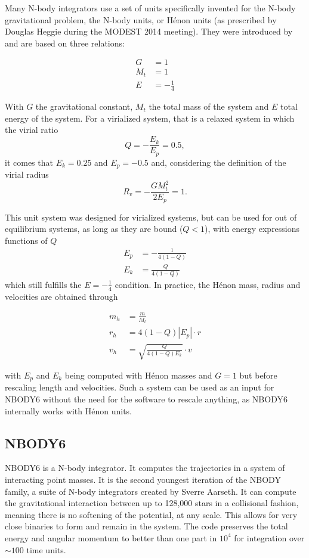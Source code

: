 Many N-body integrators use a set of units specifically invented for the N-body gravitational problem, the N-body units, or H\'enon units (as prescribed by Douglas Heggie during the MODEST 2014 meeting). They were introduced by \cite{Henon1971} and are based on three relations:

\begin{align}
G &= 1\\
M_t &= 1\\
E &= -\frac{1}{4}
\end{align}

With $G$ the gravitational constant, $M_t$ the total mass of the system and $E$ total energy of the system. For a virialized system, that is a relaxed system in which the virial ratio 
\begin{equation}
Q = - \frac{E_k}{E_p} = 0.5,
\end{equation}
it comes that $E_k=0.25$ and $E_p = -0.5$ and, considering the definition of the virial radius 
\begin{equation}
R_v = - \frac{G M_t^2}{2 E_p} = 1.
\end{equation} 

This unit system was designed for virialized systems, but can be used for out of equilibrium systems, as long as they are bound ($Q <1$), with energy expressions functions of $Q$
\begin{align}
E_p  &= - \frac{1}{4(1-Q)}\\
E_k &= \frac{Q}{4(1-Q)}
\end{align}
which still fulfills the $E = -\frac{1}{4}$ condition. In practice, the H\'enon mass, radius and velocities are obtained through

\begin{align}
m_h &= \frac{m}{M_t}\\
r_h &= 4 (1-Q) |E_p| \cdot r\\
v_h &= \sqrt{ \frac{Q}{4(1-Q) E_k} } \cdot v
\end{align}

with $E_p$ and $E_k$ being computed with H\'enon masses and $G=1$ but before rescaling length and velocities. Such a system can be used as an input for NBODY6 without the need for the software to rescale anything, as NBODY6 internally works with H\'enon units.


\subsection{NBODY6}


NBODY6 is a N-body integrator. It computes the trajectories in a system of interacting point masses. It is the second youngest iteration of the NBODY family, a suite of N-body integrators created by Sverre Aarseth. It can compute the gravitational interaction between up to 128,000 stars in a collisional fashion, meaning there is no softening of the potential, at any scale. This allows for very close binaries to form and remain in the system. The code preserves the total energy and angular momentum to better than one part in $10^4$ for integration over $\sim 100 $ time units.

